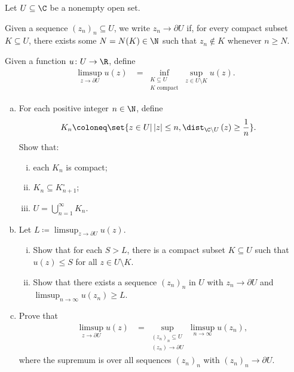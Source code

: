 \documentclass[10pt]{mypackage}
\begin{document}
\RaggedRight
\begin{problem}[Problem 1]
  Let $U\subseteq \C$ be a nonempty open set.\newline

  Given a sequence $\left( z_n \right)_n\subseteq U$, we write $z_n\rightarrow \partial U$ if, for every compact subset $K\subseteq U$, there exists some $N = N(K)\in \N$ such that $z_n\notin K$ whenever $n\geq N$.\newline

  Given a function $u\colon U\rightarrow \R$, define
  \begin{align*}
    \limsup_{z\rightarrow \partial U} u(z) &= \inf_{\substack{K\subseteq U\\K\text{ compact}}} \sup_{z\in U\setminus K} u(z).
  \end{align*}
  \begin{enumerate}[(a)]
    \item For each positive integer $n\in\N$, define
      \begin{align*}
        K_n &\coloneq \set{z\in U | \left\vert z \right\vert \leq n, \dist_{\C\setminus U}\left( z \right) \geq \frac{1}{n}}.
      \end{align*}
      Show that:
      \begin{enumerate}[(i)]
        \item each $K_n$ is compact;
        \item $K_n\subseteq K_{n+1}^{\circ}$;
        \item $U = \bigcup_{n=1}^{\infty}K_n$.
      \end{enumerate}
    \item Let $L \coloneq \limsup_{z\rightarrow \partial U} u(z)$.
      \begin{enumerate}[(i)]
        \item Show that for each $S > L$, there is a compact subset $K\subseteq U$ such that $u(z)\leq S$ for all $z\in U\setminus K$.
        \item Show that there exists a sequence $\left( z_n \right)_n$ in $U$ with $z_n\rightarrow \partial U$ and $\limsup_{n\rightarrow\infty}u\left( z_n \right)\geq L$.
      \end{enumerate}
    \item Prove that
      \begin{align*}
        \limsup_{z\rightarrow \partial U} u(z) &= \sup_{\substack{\left( z_n \right)_n\subseteq U\\\left( z_n \right)\rightarrow \partial U}}\limsup_{n\rightarrow\infty} u\left( z_n \right),
      \end{align*}
      where the supremum is over all sequences $\left( z_n \right)_n$ with $\left( z_n \right)_n\rightarrow \partial U$.
  \end{enumerate}
\end{problem}
\end{document}

